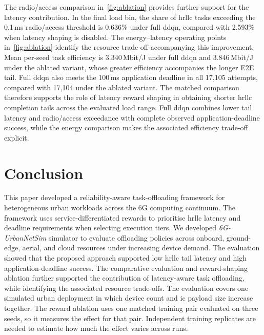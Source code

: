 \documentclass[journal]{IEEEtran}
\newcommand{\Subfigref}[2]{\mbox{\autoref{#1}\subref{#2}}}
\begin{document}
The radio/access comparison in~\Subfigref{fig:ablation}{fig:ablation-radio} provides further support for the latency contribution. In the final load bin, the share of \ac{hrllc} tasks exceeding the 0.1\,ms radio/access threshold is 0.636\% under full \ac{ddqn}, compared with 2.593\% when latency shaping is disabled.
%
The energy--latency operating points in~\Subfigref{fig:ablation}{fig:ablation-energy} identify the resource trade-off accompanying this improvement. Mean per-seed task efficiency is 3.340\,Mbit/J under full \ac{ddqn} and 3.846\,Mbit/J under the ablated variant, whose greater efficiency accompanies the longer E2E tail. Full \ac{ddqn} also meets the 100\,ms application deadline in all 17,105 attempts, compared with 17,104 under the ablated variant.
%
The matched comparison therefore supports the role of latency reward shaping in obtaining shorter \ac{hrllc} completion tails across the evaluated load range. Full \ac{ddqn} combines lower tail latency and radio/access exceedance with complete observed application-deadline success, while the energy comparison makes the associated efficiency trade-off explicit.



\section{Conclusion}
\label{sec:conclusion}

This paper developed a reliability-aware task-offloading framework for heterogeneous urban workloads across the 6G computing continuum. The framework uses service-differentiated rewards to prioritise \ac{hrllc} latency and deadline requirements when selecting execution tiers. We developed \textit{6G-UrbanNetSim} simulator to evaluate offloading policies across onboard, ground-edge, aerial, and cloud resources under increasing device demand.
%
The evaluation showed that the proposed approach supported low \ac{hrllc} tail latency and high application-deadline success. The comparative evaluation and reward-shaping ablation further supported the contribution of latency-aware task offloading, while identifying the associated resource trade-offs.
%
The evaluation covers one simulated urban deployment in which device count and \acs{ic} payload size increase together. The reward ablation uses one matched training pair evaluated on three seeds, so it measures the effect for that pair. Independent training replicates are needed to estimate how much the effect varies across runs.









\end{document}
